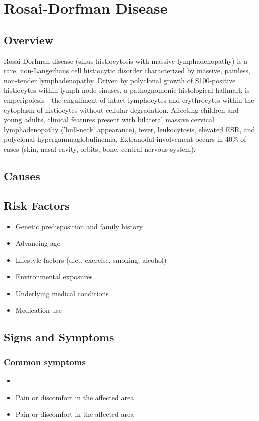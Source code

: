 \chapter{Rosai-Dorfman Disease}
\label{sec:Rosai-Dorfman Disease}

\section{Overview}
Rosai-Dorfman disease (sinus histiocytosis with massive lymphadenopathy) is a rare, non-Langerhans cell histiocytic disorder characterized by massive, painless, non-tender lymphadenopathy. Driven by polyclonal growth of S100-positive histiocytes within lymph node sinuses, a pathognomonic histological hallmark is emperipolesis---the engulfment of intact lymphocytes and erythrocytes within the cytoplasm of histiocytes without cellular degradation. Affecting children and young adults, clinical features present with bilateral massive cervical lymphadenopathy ('bull-neck' appearance), fever, leukocytosis, elevated ESR, and polyclonal hypergammaglobulinemia. Extranodal involvement occurs in 40\% of cases (skin, nasal cavity, orbits, bone, central nervous system).
\section{Causes}
\section{Risk Factors}

\begin{itemize}[noitemsep]
  \item Genetic predisposition and family history
  \item Advancing age
  \item Lifestyle factors (diet, exercise, smoking, alcohol)
  \item Environmental exposures
  \item Underlying medical conditions
  \item Medication use
\end{itemize}
\section{Signs and Symptoms}

\subsection{Common symptoms}
\begin{itemize}[noitemsep]
  \item \item Pain or discomfort in the affected area    \item Pain or discomfort in the affected area
  \end{itemize}

